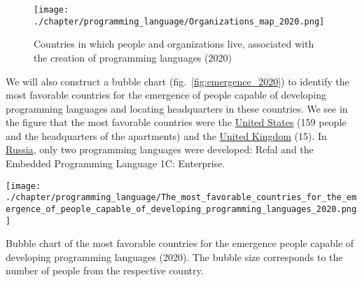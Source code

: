 \begin{figure}[h]
\centering
	\texttt{[image: ./chapter/programming\_language/Organizations\_map\_2020.png]}
	\caption{Countries in which people and organizations live, associated with the creation of programming languages (2020)}
	\label{fig:organizations_2020}
\end{figure}

We will also construct a bubble chart (fig.~\ref{fig:emergence_2020}) to identify the most favorable countries for the emergence of people capable of developing programming languages and locating headquarters in these countries. We see in the figure that the most favorable countries were the \href{https://en.wikipedia.org/wiki/United_States}{United States} (159 people and the headquarters of the apartments) and the \href{https://en.wikipedia.org/wiki/United_Kingdom}{United Kingdom} (15). In \href{https://en.wikipedia.org/wiki/Russia}{Russia}, only two programming languages were developed: Refal and the Embedded Programming Language 1C: Enterprise.

\begin{marginfigure}[7cm]
	\texttt{[image: ./chapter/programming\_language/The\_most\_favorable\_countries\_for\_the\_emergence\_of\_people\_capable\_of\_developing\_programming\_languages\_2020.png]}
	\caption{Bubble chart of the most favorable countries for the emergence people capable of developing programming languages (2020). The bubble size corresponds to the number of people from the respective country.}
	\label{fig:emergence_2020}
\end{marginfigure}

